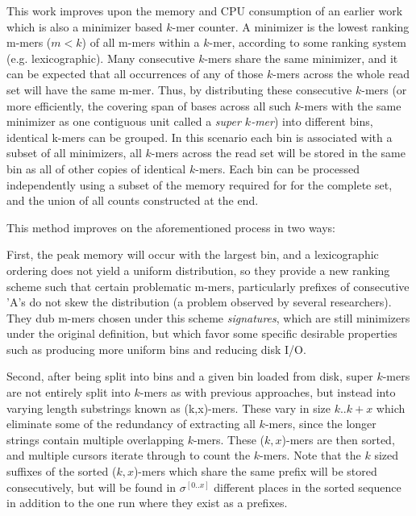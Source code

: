 \documentclass[doctor]{thesis}
\begin{document}
This work improves upon the memory and CPU consumption of an earlier work which is also a minimizer based $k$-mer counter.
A minimizer is the lowest ranking m-mers ($m < k$) of all m-mers within a $k$-mer, according to some ranking system (e.g. lexicographic).  Many consecutive $k$-mers share the same minimizer, and it can be expected that all occurrences of any of those $k$-mers across the whole read set will have the same m-mer.
Thus, by distributing these consecutive $k$-mers (or more efficiently, the covering span of bases across all such $k$-mers with the same minimizer as one contiguous unit called a \emph{super $k$-mer}) into different bins, identical k-mers can be grouped.  In this scenario each bin is associated with a subset of all minimizers, all $k$-mers across the read set will be stored in the same bin as all of other copies of identical $k$-mers.
Each bin can be processed independently using a subset of the memory required for for the complete set, and the union of all counts constructed at the end.

This method improves on the aforementioned process in two ways:

First, the peak memory will occur with the largest bin, and a lexicographic ordering does not yield a uniform distribution, so they provide a new ranking scheme such that certain problematic m-mers, particularly prefixes of consecutive 'A's do not skew the distribution (a problem observed by several researchers).
They dub m-mers chosen under this scheme \emph{signatures}, which are still minimizers under the original definition, but which favor some specific desirable properties such as producing more uniform bins and reducing disk I/O.


Second, after being split into bins and a given bin loaded from disk, super $k$-mers are not entirely split into $k$-mers as with previous approaches, but instead into varying length substrings known as (k,x)-mers.
These vary in size $k$..$k+x$ which eliminate some of the redundancy of extracting all $k$-mers, since the longer strings contain multiple overlapping $k$-mers.
These ($k,x$)-mers are then sorted, and multiple cursors iterate through to count the $k$-mers.
Note that the $k$ sized suffixes of the sorted ($k,x$)-mers which share the same prefix will be stored consecutively, but will be found in $\sigma^{[0..x]}$ different places in the sorted sequence in addition to the one run where they exist as a prefixes.


\end{document}
